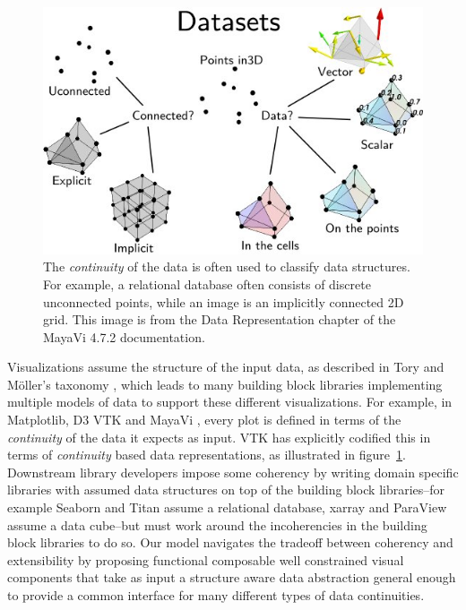 \documentclass[../main.tex]{subfiles}
\begin{document}
\begin{figure}[H]
    \includegraphics[width=1\textwidth]{figures/intro/dataset_diagram.png}
    \caption{The \textit{continuity} of the data is often used to classify data structures. For example, a relational database often consists of discrete unconnected points, while an image is an implicitly connected 2D grid. This image is from the Data Representation chapter of the MayaVi 4.7.2 documentation. \cite{DataRepresentationMayavi}}
    \label{fig:intro:data:format}
\end{figure}

Visualizations assume the structure of the input data, as described in Tory and Möller's taxonomy \cite{toryRethinkingVisualizationHighlevel2004}, which leads to many building block libraries implementing multiple models of data to support these different visualizations. For example, in Matplotlib, D3 \cite{bostockDataDrivenDocuments2011} VTK \cite{hanwellVisualizationToolkitVTK2015,geveciVTK2012} and MayaVi \cite{RamachandranMayaVI2011}, every plot is defined in terms of the \textit{continuity} of the data it expects as input. VTK has explicitly codified this in terms of \textit{continuity} based data representations, as illustrated in figure~\ref{fig:intro:data:format}. Downstream library developers impose some coherency by writing domain specific libraries with assumed data structures on top of the building block libraries--for example Seaborn \cite{waskom2020seaborn} and Titan \cite{brianwylieUnifiedToolkitInformation2009} assume a relational database, xarray \cite{hoyer2017xarray} and ParaView \cite{ahrens2005paraview} assume a data cube--but must work around the incoherencies in the building block libraries to do so. Our model navigates the tradeoff between coherency and extensibility by proposing functional composable well constrained visual components that take as input a structure aware data abstraction general enough to provide a common interface for many different types of data continuities. 
\end{document}
